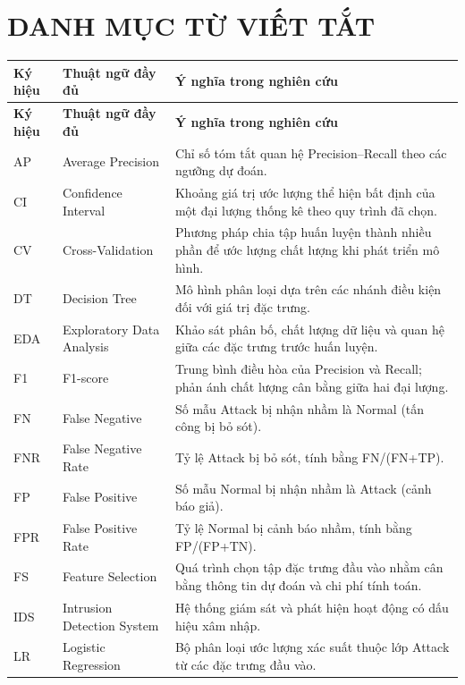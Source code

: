 \chapter*{DANH MỤC TỪ VIẾT TẮT}
\begin{longtable}{@{}p{.115\linewidth}p{.345\linewidth}p{.485\linewidth}@{}}
\toprule
\textbf{Ký hiệu} & \textbf{Thuật ngữ đầy đủ} & \textbf{Ý nghĩa trong nghiên cứu}\\
\midrule
\endfirsthead
\toprule
\textbf{Ký hiệu} & \textbf{Thuật ngữ đầy đủ} & \textbf{Ý nghĩa trong nghiên cứu}\\
\midrule
\endhead
AP & Average Precision & Chỉ số tóm tắt quan hệ Precision--Recall theo các ngưỡng dự đoán.\\
CI & Confidence Interval & Khoảng giá trị ước lượng thể hiện bất định của một đại lượng thống kê theo quy trình đã chọn.\\
CV & Cross-Validation & Phương pháp chia tập huấn luyện thành nhiều phần để ước lượng chất lượng khi phát triển mô hình.\\
DT & Decision Tree & Mô hình phân loại dựa trên các nhánh điều kiện đối với giá trị đặc trưng.\\
EDA & Exploratory Data Analysis & Khảo sát phân bố, chất lượng dữ liệu và quan hệ giữa các đặc trưng trước huấn luyện.\\
F1 & F1-score & Trung bình điều hòa của Precision và Recall; phản ánh chất lượng cân bằng giữa hai đại lượng.\\
FN & False Negative & Số mẫu Attack bị nhận nhầm là Normal (tấn công bị bỏ sót).\\
FNR & False Negative Rate & Tỷ lệ Attack bị bỏ sót, tính bằng FN/(FN+TP).\\
FP & False Positive & Số mẫu Normal bị nhận nhầm là Attack (cảnh báo giả).\\
FPR & False Positive Rate & Tỷ lệ Normal bị cảnh báo nhầm, tính bằng FP/(FP+TN).\\
FS & Feature Selection & Quá trình chọn tập đặc trưng đầu vào nhằm cân bằng thông tin dự đoán và chi phí tính toán.\\
IDS & Intrusion Detection System & Hệ thống giám sát và phát hiện hoạt động có dấu hiệu xâm nhập.\\
LR & Logistic Regression & Bộ phân loại ước lượng xác suất thuộc lớp Attack từ các đặc trưng đầu vào.\\

\end{longtable}

